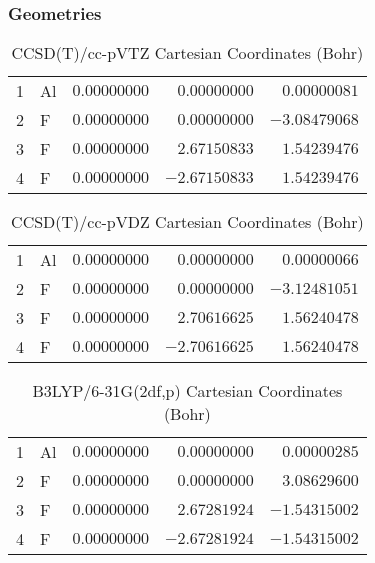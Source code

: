 \documentclass[10pt,oneside]{article}
\begin{document}
\clearpage

\subsection{\ \ \ }

\subsubsection*{Geometries}
\begin{table}[h!]
\centering
\caption{CCSD(T)/cc-pVTZ Cartesian Coordinates (Bohr)}
\begin{tabular}{llrrr}
1  & Al & $ 0.00000000$ & $ 0.00000000$ & $ 0.00000081$ \\
2  & F  & $ 0.00000000$ & $ 0.00000000$ & $-3.08479068$ \\
3  & F  & $ 0.00000000$ & $ 2.67150833$ & $ 1.54239476$ \\
4  & F  & $ 0.00000000$ & $-2.67150833$ & $ 1.54239476$ \\
\end{tabular}
\end{table}

\begin{table}[h!]
\centering
\caption{CCSD(T)/cc-pVDZ Cartesian Coordinates (Bohr)}
\begin{tabular}{llrrr}
1  & Al & $ 0.00000000$ & $ 0.00000000$ & $ 0.00000066$ \\
2  & F  & $ 0.00000000$ & $ 0.00000000$ & $-3.12481051$ \\
3  & F  & $ 0.00000000$ & $ 2.70616625$ & $ 1.56240478$ \\
4  & F  & $ 0.00000000$ & $-2.70616625$ & $ 1.56240478$ \\
\end{tabular}
\end{table}

\begin{table}[h!]
\centering
\caption{B3LYP/6-31G(2df,p) Cartesian Coordinates (Bohr)}
\begin{tabular}{llrrr}
1  & Al & $ 0.00000000$ & $ 0.00000000$ & $ 0.00000285$ \\
2  & F  & $ 0.00000000$ & $ 0.00000000$ & $ 3.08629600$ \\
3  & F  & $ 0.00000000$ & $ 2.67281924$ & $-1.54315002$ \\
4  & F  & $ 0.00000000$ & $-2.67281924$ & $-1.54315002$ \\
\end{tabular}
\end{table}
\end{document}
